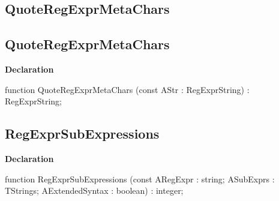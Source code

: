 \documentclass{report}
\newif\ifpdf
\begin{document}
\subsection*{\large{\textbf{QuoteRegExprMetaChars}}\normalsize\hspace{1ex}\hrulefill}
\else
\subsection*{QuoteRegExprMetaChars}
\fi
\label{RegExpr-QuoteRegExprMetaChars}
\begin{list}{}{
\setlength{\itemindent}{0cm}
\setlength{\listparindent}{0cm}
\setlength{\leftmargin}{\evensidemargin}
\addtolength{\leftmargin}{\tmplength}
\settowidth{\labelsep}{X}
\addtolength{\leftmargin}{\labelsep}
\setlength{\labelwidth}{\tmplength}
}
\item[\textbf{Declaration}\hfill]
\ifpdf
\begin{flushleft}
\fi
\begin{ttfamily}
function QuoteRegExprMetaChars (const AStr : RegExprString) : RegExprString;\end{ttfamily}

\ifpdf
\end{flushleft}
\fi

\end{list}
\ifpdf
\subsection*{\large{\textbf{RegExprSubExpressions}}\normalsize\hspace{1ex}\hrulefill}
\else
\subsection*{RegExprSubExpressions}
\fi
\label{RegExpr-RegExprSubExpressions}
\begin{list}{}{
\setlength{\itemindent}{0cm}
\setlength{\listparindent}{0cm}
\setlength{\leftmargin}{\evensidemargin}
\addtolength{\leftmargin}{\tmplength}
\settowidth{\labelsep}{X}
\addtolength{\leftmargin}{\labelsep}
\setlength{\labelwidth}{\tmplength}
}
\item[\textbf{Declaration}\hfill]
\ifpdf
\begin{flushleft}
\fi
\begin{ttfamily}
function RegExprSubExpressions (const ARegExpr : string; ASubExprs : TStrings; AExtendedSyntax : boolean) : integer;\end{ttfamily}

\ifpdf
\end{flushleft}
\fi

\end{list}
\end{document}
